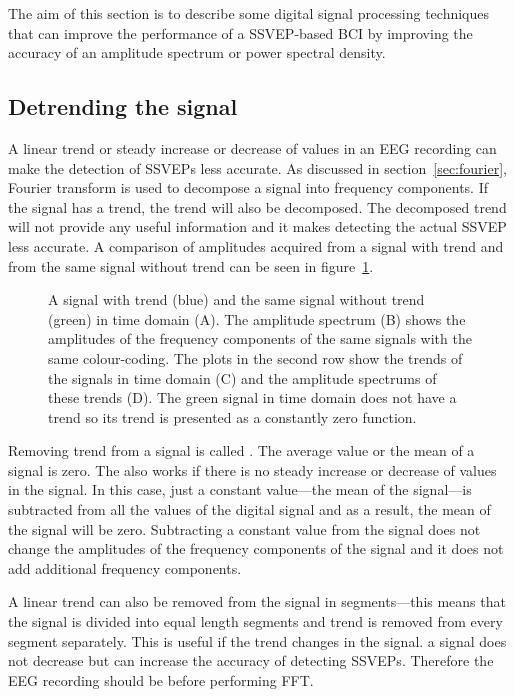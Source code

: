 The aim of this section is to describe some digital signal processing techniques that can improve the performance of a \gls{SSVEP}-based \gls{BCI} by improving the accuracy of an amplitude spectrum or \gls{power spectral density}.

\subsection{Detrending the signal}
\label{sec:detrend}

A linear \gls{trend} or steady increase or decrease of values in an \gls{EEG} recording can make the detection of \glspl{SSVEP} less accurate. As discussed in section~\ref{sec:fourier}, \gls{Fourier transform} is used to decompose a signal into \glspl{frequency component}. If the signal has a \gls{trend}, the \gls{trend} will also be decomposed. The decomposed \gls{trend} will not provide any useful information and it makes detecting the actual \gls{SSVEP} less accurate. A comparison of amplitudes acquired from a signal with trend and from the same signal without \gls{trend} can be seen in figure~\ref{fig:detrend}.

\begin{figure}[h!]
	
	\caption{A signal with trend (blue) and the same signal without trend (green) in time domain (A). The amplitude spectrum (B) shows the amplitudes of the frequency components of the same signals with the same colour-coding. The plots in the second row show the trends of the signals in time domain (C) and the amplitude spectrums of these trends (D). The green signal in time domain does not have a trend so its trend is presented as a constantly zero function.}
	\label{fig:detrend}
\end{figure}

Removing \gls{trend} from a signal is called . The average value or the \gls{mean} of a  signal is zero. The  also works if there is no steady increase or decrease of values in the signal. In this case, just a constant value---the \gls{mean} of the signal---is subtracted from all the values of the \gls{digital signal} and as a result, the \gls{mean} of the signal will be zero. Subtracting a constant value from the signal does not change the amplitudes of the \glspl{frequency component} of the signal and it does not add additional \glspl{frequency component}.

A linear \gls{trend} can also be removed from the signal in segments---this means that the signal is divided into equal length segments and \gls{trend} is removed from every segment separately. This is useful if the \gls{trend} changes in the signal.  a signal does not decrease but can increase the accuracy of detecting \glspl{SSVEP}. Therefore the \gls{EEG} recording should be  before performing \gls{FFT}.

